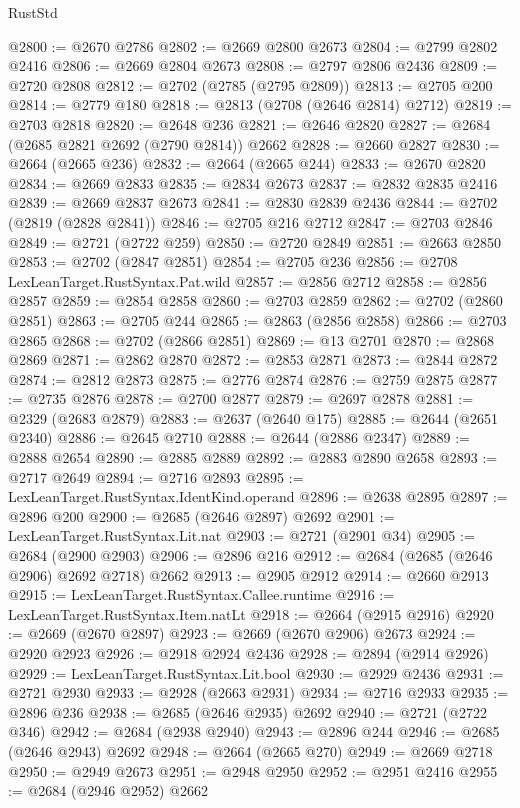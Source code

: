 \begin{lexlean}{RustStd}
\begin{coremodule}
@2800 := @2670 @2786
@2802 := @2669 @2800 @2673
@2804 := @2799 @2802 @2416
@2806 := @2669 @2804 @2673
@2808 := @2797 @2806 @2436
@2809 := @2720 @2808
@2812 := @2702 (@2785 (@2795 @2809))
@2813 := @2705 @200
@2814 := @2779 @180
@2818 := @2813 (@2708 (@2646 @2814) @2712)
@2819 := @2703 @2818
@2820 := @2648 @236
@2821 := @2646 @2820
@2827 := @2684 (@2685 @2821 @2692 (@2790 @2814)) @2662
@2828 := @2660 @2827
@2830 := @2664 (@2665 @236)
@2832 := @2664 (@2665 @244)
@2833 := @2670 @2820
@2834 := @2669 @2833
@2835 := @2834 @2673
@2837 := @2832 @2835 @2416
@2839 := @2669 @2837 @2673
@2841 := @2830 @2839 @2436
@2844 := @2702 (@2819 (@2828 @2841))
@2846 := @2705 @216 @2712
@2847 := @2703 @2846
@2849 := @2721 (@2722 @259)
@2850 := @2720 @2849
@2851 := @2663 @2850
@2853 := @2702 (@2847 @2851)
@2854 := @2705 @236
@2856 := @2708 LexLeanTarget.RustSyntax.Pat.wild
@2857 := @2856 @2712
@2858 := @2856 @2857
@2859 := @2854 @2858
@2860 := @2703 @2859
@2862 := @2702 (@2860 @2851)
@2863 := @2705 @244
@2865 := @2863 (@2856 @2858)
@2866 := @2703 @2865
@2868 := @2702 (@2866 @2851)
@2869 := @13 @2701
@2870 := @2868 @2869
@2871 := @2862 @2870
@2872 := @2853 @2871
@2873 := @2844 @2872
@2874 := @2812 @2873
@2875 := @2776 @2874
@2876 := @2759 @2875
@2877 := @2735 @2876
@2878 := @2700 @2877
@2879 := @2697 @2878
@2881 := @2329 (@2683 @2879)
@2883 := @2637 (@2640 @175)
@2885 := @2644 (@2651 @2340)
@2886 := @2645 @2710
@2888 := @2644 (@2886 @2347)
@2889 := @2888 @2654
@2890 := @2885 @2889
@2892 := @2883 @2890 @2658
@2893 := @2717 @2649
@2894 := @2716 @2893
@2895 := LexLeanTarget.RustSyntax.IdentKind.operand
@2896 := @2638 @2895
@2897 := @2896 @200
@2900 := @2685 (@2646 @2897) @2692
@2901 := LexLeanTarget.RustSyntax.Lit.nat
@2903 := @2721 (@2901 @34)
@2905 := @2684 (@2900 @2903)
@2906 := @2896 @216
@2912 := @2684 (@2685 (@2646 @2906) @2692 @2718) @2662
@2913 := @2905 @2912
@2914 := @2660 @2913
@2915 := LexLeanTarget.RustSyntax.Callee.runtime
@2916 := LexLeanTarget.RustSyntax.Item.natLt
@2918 := @2664 (@2915 @2916)
@2920 := @2669 (@2670 @2897)
@2923 := @2669 (@2670 @2906) @2673
@2924 := @2920 @2923
@2926 := @2918 @2924 @2436
@2928 := @2894 (@2914 @2926)
@2929 := LexLeanTarget.RustSyntax.Lit.bool
@2930 := @2929 @2436
@2931 := @2721 @2930
@2933 := @2928 (@2663 @2931)
@2934 := @2716 @2933
@2935 := @2896 @236
@2938 := @2685 (@2646 @2935) @2692
@2940 := @2721 (@2722 @346)
@2942 := @2684 (@2938 @2940)
@2943 := @2896 @244
@2946 := @2685 (@2646 @2943) @2692
@2948 := @2664 (@2665 @270)
@2949 := @2669 @2718
@2950 := @2949 @2673
@2951 := @2948 @2950
@2952 := @2951 @2416
@2955 := @2684 (@2946 @2952) @2662

\end{coremodule}
\end{lexlean}
